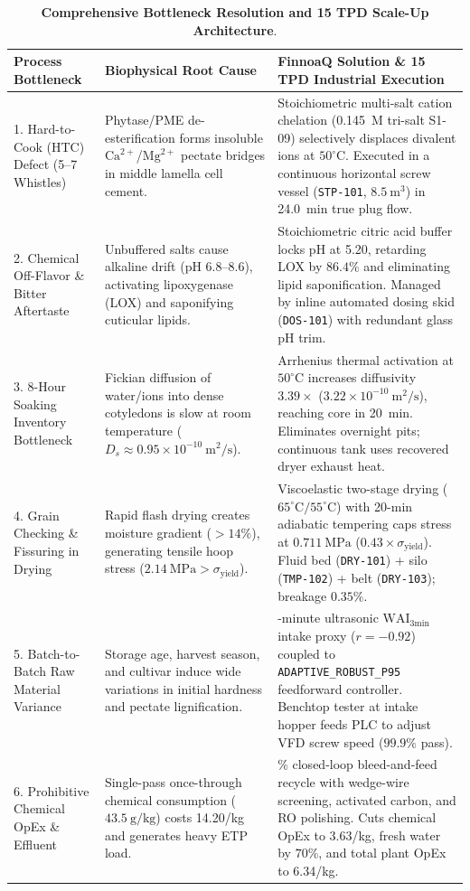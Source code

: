 \documentclass[10pt,a4paper]{article}
\newcommand{\inr}{\text{INR~}}
\begin{document}
\begin{table}[H]
\centering
\footnotesize
\setlength{\tabcolsep}{3.5pt}
\caption{\textbf{Comprehensive Bottleneck Resolution and 15 TPD Scale-Up Architecture}.}
\label{tab:exec_problem_solution}
\begin{tabularx}{\linewidth}{p{3.0cm}p{4.6cm}>{\raggedright\arraybackslash}X}
\toprule
\textbf{Process Bottleneck} & \textbf{Biophysical Root Cause} & \textbf{FinnoaQ Solution \& 15 TPD Industrial Execution} \\
\midrule
1. Hard-to-Cook (HTC) Defect (5--7 Whistles) & Phytase/PME de-esterification forms insoluble $\mathrm{Ca}^{2+}$/$\mathrm{Mg}^{2+}$ pectate bridges in middle lamella cell cement. & Stoichiometric multi-salt cation chelation (0.145~M tri-salt S1-09) selectively displaces divalent ions at $50^\circ\mathrm{C}$. Executed in a continuous horizontal screw vessel (\texttt{STP-101}, $8.5\ \mathrm{m}^3$) in 24.0~min true plug flow. \\
2. Chemical Off-Flavor \& Bitter Aftertaste & Unbuffered salts cause alkaline drift (pH 6.8--8.6), activating lipoxygenase (LOX) and saponifying cuticular lipids. & Stoichiometric citric acid buffer locks pH at 5.20, retarding LOX by $86.4\%$ and eliminating lipid saponification. Managed by inline automated dosing skid (\texttt{DOS-101}) with redundant glass pH trim. \\
3. 8-Hour Soaking Inventory Bottleneck & Fickian diffusion of water/ions into dense cotyledons is slow at room temperature ($D_s \approx 0.95 \times 10^{-10}\ \mathrm{m^2/s}$). & Arrhenius thermal activation at $50^\circ\mathrm{C}$ increases diffusivity $3.39\times$ ($3.22 \times 10^{-10}\ \mathrm{m^2/s}$), reaching core in 20~min. Eliminates overnight pits; continuous tank uses recovered dryer exhaust heat. \\
4. Grain Checking \& Fissuring in Drying & Rapid flash drying creates moisture gradient ($>14\%$), generating tensile hoop stress ($2.14\ \mathrm{MPa} > \sigma_{\mathrm{yield}}$). & Viscoelastic two-stage drying ($65^\circ\mathrm{C} / 55^\circ\mathrm{C}$) with 20-min adiabatic tempering caps stress at $0.711\ \mathrm{MPa}$ ($0.43\times \sigma_{\mathrm{yield}}$). Fluid bed (\texttt{DRY-101}) + silo (\texttt{TMP-102}) + belt (\texttt{DRY-103}); breakage $0.35\%$. \\
5. Batch-to-Batch Raw Material Variance & Storage age, harvest season, and cultivar induce wide variations in initial hardness and pectate lignification. & 3-minute ultrasonic $\mathrm{WAI}_{\mathrm{3min}}$ intake proxy ($r = -0.92$) coupled to \texttt{ADAPTIVE\_ROBUST\_P95} feedforward controller. Benchtop tester at intake hopper feeds PLC to adjust VFD screw speed ($99.9\%$ pass). \\
6. Prohibitive Chemical OpEx \& Effluent & Single-pass once-through chemical consumption ($43.5\ \mathrm{g/kg}$) costs \inr14.20/kg and generates heavy ETP load. & 85\% closed-loop bleed-and-feed recycle with wedge-wire screening, activated carbon, and RO polishing. Cuts chemical OpEx to \inr3.63/kg, fresh water by $70\%$, and total plant OpEx to \inr6.34/kg. \\
\bottomrule
\end{tabularx}
\end{table}
\end{document}
